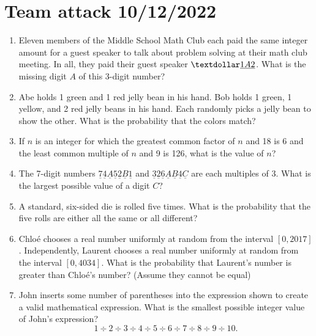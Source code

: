\documentclass[12pt]{article}
\begin{document}
    \pagestyle{empty}
    \section*{Team attack 10/12/2022}
    \begin{enumerate}[leftmargin=3mm]
        \item Eleven members of the Middle School Math Club each paid the same integer amount for a guest speaker to talk about problem solving at their math club meeting. In all, they paid their guest speaker $\textdollar\underline{1}\underline{A}\underline{2}$. What is the missing digit $A$ of this 3-digit number? %
        \item Abe holds 1 green and 1 red jelly bean in his hand. Bob holds 1 green, 1 yellow, and 2 red jelly beans in his hand. Each randomly picks a jelly bean to show the other. What is the probability that the colors match? %
        \item If $n$ is an integer for which the greatest common factor of $n$ and 18 is 6 and the
        least common multiple of $n$ and 9 is 126, what is the value of $n$? %
        \item The 7-digit numbers $\underline{7} \underline{4} \underline{A} \underline{5} \underline{2} \underline{B} \underline{1}$ and $\underline{3} \underline{2} \underline{6} \underline{A} \underline{B} \underline{4} \underline{C}$ are each multiples of 3. What is the largest possible value of a digit $C$? %
        \item A standard, six-sided die is rolled five times. What is the probability that the five
        rolls are either all the same or all different? %
        \item Chloé chooses a real number uniformly at random from the interval $[0, 2017]$. Independently, Laurent chooses a real number uniformly at random from the interval $[0, 4034]$. What is the probability that Laurent's number is greater than Chloé's number? (Assume they cannot be equal) %
        \item John inserts some number of parentheses into the expression shown to create a valid mathematical expression. What is the smallest possible integer value of John’s expression? 
        \[ 1 \div 2 \div 3 \div 4 \div 5 \div 6 \div 7 \div 8 \div 9 \div 10.\] %
    \end{enumerate}

    \newpage
\end{document}
